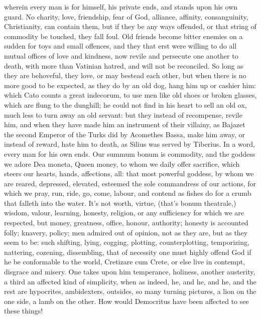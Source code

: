 {wherein every man is for himself, his private ends, and stands upon his
own guard. No charity, love, friendship, fear of God, alliance,
affinity, consanguinity, Christianity, can contain them, but if they be
any ways offended, or that string of commodity be touched, they fall
foul. Old friends become bitter enemies on a sudden for toys and small
offences, and they that erst were willing to do all mutual offices of
love and kindness, now revile and persecute one another to death, with
more than Vatinian hatred, and will not be reconciled. So long as they
are behoveful, they love, or may bestead each other, but when there is
no more good to be expected, as they do by an old dog, hang him up or
cashier him: which  Cato counts a great indecorum, to use men like
old shoes or broken glasses, which are flung to the dunghill; he could
not find in his heart to sell an old ox, much less to turn away an old
servant: but they instead of recompense, revile him, and when they have
made him an instrument of their villainy, as Bajazet the second
Emperor of the Turks did by Acomethes Bassa, make him away, or instead
of reward, hate him to death, as Silius was served by Tiberius. In
a word, every man for his own ends. Our summum bonum is commodity, and
the goddess we adore Dea moneta, Queen money, to whom we daily offer
sacrifice, which steers our hearts, hands, affections, all: that
most powerful goddess, by whom we are reared, depressed, elevated,
esteemed the sole commandress of our actions, for which we pray,
run, ride, go, come, labour, and contend as fishes do for a crumb that
falleth into the water. It's not worth, virtue, (that's bonum
theatrale,) wisdom, valour, learning, honesty, religion, or any
sufficiency for which we are respected, but money, greatness,
office, honour, authority; honesty is accounted folly; knavery, policy;
men admired out of opinion, not as they are, but as they seem to
be: such shifting, lying, cogging, plotting, counterplotting,
temporizing, nattering, cozening, dissembling, that of necessity
one must highly offend God if he be conformable to the world, Cretizare
cum Crete, or else live in contempt, disgrace and misery. One takes
upon him temperance, holiness, another austerity, a third an affected
kind of simplicity, when as indeed, he, and he, and he, and the rest
are hypocrites, ambidexters, outsides, so many turning pictures, a
lion on the one side, a lamb on the other. How would Democritus
have been affected to see these things!

}
